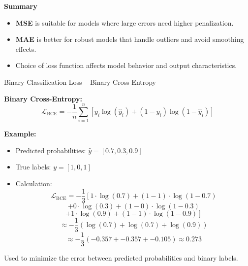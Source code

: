 \documentclass[serif, aspectratio=169]{beamer}
\begin{document}
\begin{frame}{\textbf{Summary}}
    \begin{itemize}
        \item \textbf{MSE} is suitable for models where large errors need higher penalization.
        \item \textbf{MAE} is better for robust models that handle outliers and avoid smoothing effects.
        \item Choice of loss function affects model behavior and output characteristics.
    \end{itemize}
\end{frame}
\begin{frame}{Binary Classification Loss – Binary Cross-Entropy}

    \textbf{Binary Cross-Entropy:}
    \[
    \mathcal{L}_{\text{BCE}} = -\frac{1}{n} \sum_{i=1}^{n} \left[ y_i \log(\hat{y}_i) + (1 - y_i) \log(1 - \hat{y}_i) \right]
    \]

    \textbf{Example:}
    \begin{itemize}
        \item Predicted probabilities: \( \hat{y} = [0.7, 0.3, 0.9] \)
        \item True labels: \( y = [1, 0, 1] \)
        \item Calculation:
        \[
        \mathcal{L}_{\text{BCE}} = -\frac{1}{3} \left[ 1 \cdot \log(0.7) + (1 - 1) \cdot \log(1 - 0.7) \right.
        \]
        \[
        + 0 \cdot \log(0.3) + (1 - 0) \cdot \log(1 - 0.3) 
        \]
        \[
        \left. + 1 \cdot \log(0.9) + (1 - 1) \cdot \log(1 - 0.9) \right]
        \]
        \[
        \approx -\frac{1}{3} \left( \log(0.7) + \log(0.7) + \log(0.9) \right)
        \]
        \[
        \approx -\frac{1}{3} \left( -0.357 + -0.357 + -0.105 \right) \approx 0.273
        \]
    \end{itemize}
    Used to minimize the error between predicted probabilities and binary labels.
    
\end{frame}




    
\end{document}
